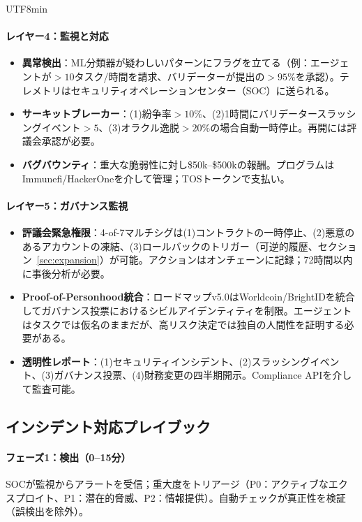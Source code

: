 \documentclass[11pt]{article}
\begin{document}
\begin{CJK}{UTF8}{min}
\begin{itemize}[noitemsep]
\paragraph{レイヤー4：監視と対応}
\begin{itemize}[noitemsep]
  \item \textbf{異常検出}：ML分類器が疑わしいパターンにフラグを立てる（例：エージェントが$>10$タスク/時間を請求、バリデーターが提出の$>95\%$を承認）。テレメトリはセキュリティオペレーションセンター（SOC）に送られる。
  \item \textbf{サーキットブレーカー}：(1)紛争率$>10\%$、(2)1時間にバリデータースラッシングイベント$>5$、(3)オラクル逸脱$>20\%$の場合自動一時停止。再開には評議会承認が必要。
  \item \textbf{バグバウンティ}：重大な脆弱性に対し\$50k--\$500kの報酬。プログラムはImmunefi/HackerOneを介して管理；TOSトークンで支払い。
\end{itemize}

\paragraph{レイヤー5：ガバナンス監視}
\begin{itemize}[noitemsep]
  \item \textbf{評議会緊急権限}：4-of-7マルチシグは(1)コントラクトの一時停止、(2)悪意のあるアカウントの凍結、(3)ロールバックのトリガー（可逆的履歴、セクション~\ref{sec:expansion}）が可能。アクションはオンチェーンに記録；72時間以内に事後分析が必要。
  \item \textbf{Proof-of-Personhood統合}：ロードマップv5.0はWorldcoin/BrightIDを統合してガバナンス投票におけるシビルアイデンティティを制限。エージェントはタスクでは仮名のままだが、高リスク決定では独自の人間性を証明する必要がある。
  \item \textbf{透明性レポート}：(1)セキュリティインシデント、(2)スラッシングイベント、(3)ガバナンス投票、(4)財務変更の四半期開示。Compliance APIを介して監査可能。
\end{itemize}

\subsection{インシデント対応プレイブック}

\paragraph{フェーズ1：検出（0--15分）}
SOCが監視からアラートを受信；重大度をトリアージ（P0：アクティブなエクスプロイト、P1：潜在的脅威、P2：情報提供）。自動チェックが真正性を検証（誤検出を除外）。


\end{itemize}
\end{CJK}
\end{document}
